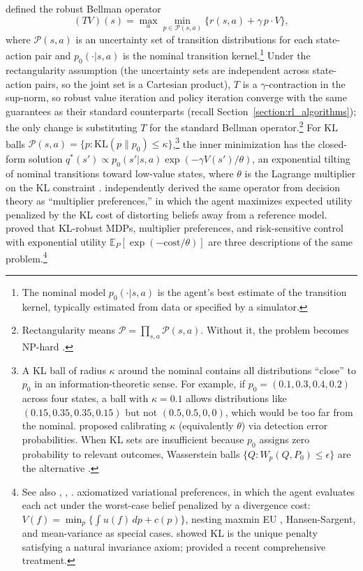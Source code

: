 \citet{Iyengar2005} defined the robust Bellman operator
\begin{equation}
  (TV)(s) = \max_a \min_{p \in \mathcal{P}(s,a)}
  \bigl\{r(s,a) + \gamma \, p \cdot V\bigr\},
  \label{eq:robust_bellman}
\end{equation}
where $\mathcal{P}(s,a)$ is an uncertainty set of transition
distributions for each state-action pair and $p_0(\cdot|s,a)$ is the
nominal transition kernel.\footnote{The nominal model $p_0(\cdot|s,a)$ is
the agent's best estimate of the transition kernel, typically estimated
from data or specified by a simulator.} Under the rectangularity assumption (the uncertainty sets are independent
across state-action pairs, so the joint set is a Cartesian product),
$T$ is a $\gamma$-contraction in
the sup-norm, so robust value iteration and policy iteration converge
with the same guarantees as their standard counterparts (recall
Section~\ref{section:rl_algorithms}); the only change is substituting $T$
for the standard Bellman operator.\footnote{Rectangularity means
$\mathcal{P} = \prod_{s,a} \mathcal{P}(s,a)$. Without it, the problem
becomes NP-hard \citep{Wiesemann2013}.} For
KL balls $\mathcal{P}(s,a) = \{p : \text{KL}(p \| p_0) \leq
\kappa\}$,\footnote{A KL ball of radius $\kappa$ around the nominal
contains all distributions ``close'' to $p_0$ in an information-theoretic
sense. For example, if $p_0 = (0.1, 0.3, 0.4, 0.2)$ across four states,
a ball with $\kappa = 0.1$ allows distributions like
$(0.15, 0.35, 0.35, 0.15)$ but not $(0.5, 0.5, 0, 0)$, which would be
too far from the nominal. \citet{Barillas2009} proposed calibrating
$\kappa$ (equivalently $\theta$) via detection error probabilities.
When KL sets are insufficient because $p_0$ assigns zero probability to
relevant outcomes, Wasserstein balls
$\{Q : W_p(Q, P_0) \leq \epsilon\}$ are the alternative
\citep{Esfahani2018, GrandClement2021, Yu2023}.} the inner minimization
has the closed-form solution
$q^*(s') \propto p_0(s'|s,a) \exp(-\gamma V(s')/\theta)$, an
exponential tilting of nominal transitions toward low-value states,
where $\theta$ is the Lagrange multiplier on the KL
constraint \citep{Nilim2005}. \citet{HansenSargent2001}
independently derived the same operator from decision theory as
``multiplier preferences,'' in which the agent maximizes expected utility
penalized by the KL cost of distorting beliefs away from a reference
model. \citet{Petersen2000} proved that KL-robust MDPs, multiplier
preferences, and risk-sensitive control with exponential utility
$\mathbb{E}_P[\exp(-\text{cost}/\theta)]$ are three descriptions of the
same problem.\footnote{See also \citet{Whittle1981}, \citet{Jacobson1973},
\citet{Fleming1992}. \citet{Maccheroni2006}
axiomatized variational preferences, in which the agent evaluates each
act under the worst-case belief penalized by a divergence cost:
$V(f) = \min_p \{\int u(f)\,dp + c(p)\}$, nesting maxmin EU
\citep{GilboaSchmeidler1989}, Hansen-Sargent, and mean-variance as
special cases. \citet{Strzalecki2011} showed KL is the unique penalty
satisfying a natural invariance axiom; \citet{HansenSargent2024}
provided a recent comprehensive treatment.}


